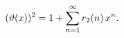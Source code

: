 \[(\mathop{\vartheta\/}\nolimits\!\left(x\right))^{2}=1+\sum_{n=1}^{\infty}%
\mathop{r_{2}\/}\nolimits\!\left(n\right)x^{n}.\]